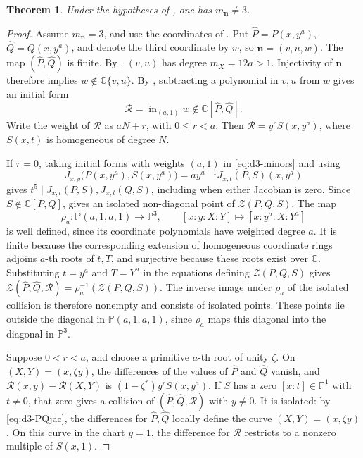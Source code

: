 \documentclass[11pt,letterpaper]{article}
\numberwithin{equation}{section}
\newtheorem{theorem}[theorem]{Theorem}
\theoremstyle{remark}
\theoremstyle{plain}
\newcommand{\C}{\mathbb{C}}
\begin{document}
\begin{theorem}
\label{thm:dthree}
Under the hypotheses of , one has
$m_{\boldsymbol n}\neq3$.
\end{theorem}

\begin{proof}
Assume $m_{\boldsymbol n}=3$, and use the coordinates of
.  Put
$\widehat P=P(x,y^a)$, $\widehat Q=Q(x,y^a)$, and denote the
third coordinate by $w$, so $\boldsymbol n=(v,u,w)$.
The map $(\widehat P,\widehat Q)$ is finite.  By ,
$(v,u)$ has degree $m_X=12a>1$.  Injectivity of $\boldsymbol n$ therefore implies
$w\notin\C\{v,u\}$.  By , subtracting a
polynomial in $v,u$ from $w$ gives an initial form
\[
 \mathcal R=\operatorname{in}_{(a,1)}w
 \notin\C[\widehat P,\widehat Q].
\]
Write the weight of $\mathcal R$ as $aN+r$, with $0\leq r<a$.  Then
$\mathcal R=y^rS(x,y^a)$, where $S(x,t)$ is homogeneous of
degree $N$.

If $r=0$, taking initial forms with weights $(a,1)$ in
\eqref{eq:d3-minors} and using
\[
 J_{x,y}\bigl(P(x,y^a),S(x,y^a)\bigr)
 =ay^{a-1}J_{x,t}(P,S)(x,y^a)
\]
gives $t^5\mid J_{x,t}(P,S),J_{x,t}(Q,S)$, including when either
Jacobian is zero.  Since $S\notin\C[P,Q]$,
 gives an isolated non-diagonal point
of $\mathcal Z(P,Q,S)$.  The map
\[
 \rho_a:\mathbb P(a,1,a,1)\longrightarrow\mathbb P^3,
 \qquad [x:y:X:Y]\longmapsto[x:y^a:X:Y^a]
\]
is well defined, since its coordinate polynomials have weighted degree $a$.
It is finite because the corresponding extension of homogeneous
coordinate rings adjoins $a$-th roots of $t,T$, and surjective because
these roots exist over $\C$.  Substituting $t=y^a$
and $T=Y^a$ in the equations defining $\mathcal Z(P,Q,S)$ gives
$\mathcal Z(\widehat P,\widehat Q,\mathcal R)
=\rho_a^{-1}(\mathcal Z(P,Q,S))$.  The inverse image under $\rho_a$ of the
isolated collision is therefore nonempty and consists of isolated points.
These points lie outside the diagonal in $\mathbb P(a,1,a,1)$, since
$\rho_a$ maps this diagonal into the diagonal in $\mathbb P^3$.

Suppose $0<r<a$, and choose a primitive $a$-th root of unity $\zeta$.
On $(X,Y)=(x,\zeta y)$, the differences of the values of $\widehat P$
and $\widehat Q$ vanish, and $\mathcal R(x,y)-\mathcal R(X,Y)$ is
$(1-\zeta^r)y^rS(x,y^a)$.  If $S$ has a zero
$[x:t]\in\mathbb P^1$ with $t\neq0$, that zero gives a collision of
$(\widehat P,\widehat Q,\mathcal R)$ with
$y\neq0$.  It is isolated: by \eqref{eq:d3-PQjac}, the differences
for $\widehat P,\widehat Q$ locally define the curve $(X,Y)=(x,\zeta y)$.
On this curve in the chart $y=1$, the difference for $\mathcal R$
restricts to a nonzero multiple of $S(x,1)$.


\end{proof}
\end{document}
